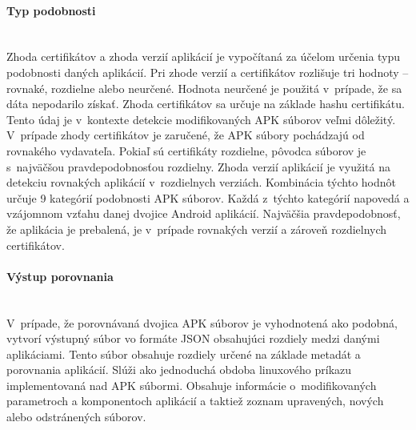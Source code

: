 \paragraph{Typ podobnosti}\mbox{}\\
Zhoda certifikátov a zhoda verzií aplikácií je vypočítaná za účelom určenia typu podobnosti daných aplikácií. Pri zhode verzií a certifikátov rozlišuje tri hodnoty – rovnaké, rozdielne alebo neurčené. Hodnota neurčené je použitá v~prípade, že sa dáta nepodarilo získať. Zhoda certifikátov sa určuje na základe hashu certifikátu. Tento údaj je v~kontexte detekcie modifikovaných APK súborov veľmi dôležitý. V~prípade zhody certifikátov je zaručené, že APK súbory pochádzajú od rovnakého vydavateľa. Pokiaľ sú certifikáty rozdielne, pôvodca súborov je s~najväčšou pravdepodobnosťou rozdielny. Zhoda verzií aplikácií je využitá na detekciu rovnakých aplikácií v~rozdielnych verziách.
Kombinácia týchto hodnôt určuje 9 kategórií podobnosti APK súborov. Každá z~týchto kategórií napovedá a vzájomnom vzťahu danej dvojice Android aplikácií. Najväčšia pravdepodobnosť, že aplikácia je prebalená, je v~prípade rovnakých verzií a zároveň rozdielnych certifikátov. 

\paragraph{Výstup porovnania}\mbox{}\\
V~prípade, že porovnávaná dvojica APK súborov je vyhodnotená ako podobná,  vytvorí výstupný súbor vo formáte JSON obsahujúci rozdiely medzi danými aplikáciami. Tento súbor obsahuje rozdiely určené na základe metadát a porovnania aplikácií. Slúži ako jednoduchá obdoba linuxového príkazu  implementovaná nad APK súbormi. Obsahuje informácie o~modifikovaných parametroch a komponentoch aplikácií a taktiež zoznam upravených, nových alebo odstránených súborov.

